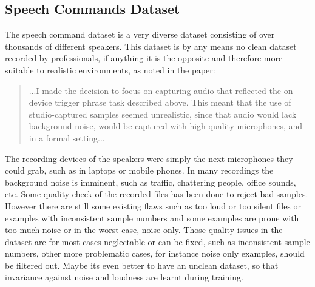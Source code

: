 
\subsection{Speech Commands Dataset}\label{sec:exp_dataset_speech_cmd}
The speech command dataset \cite{Warden2018} is a very diverse dataset consisting of over thousands of different speakers. 
This dataset is by any means no clean dataset recorded by professionals, if anything it is the opposite and therefore more suitable to realistic environments, as noted in the paper:
\begin{quote}
...I made the decision to focus on capturing audio that reflected the on-device trigger phrase task described above. 
This meant that the use of studio-captured samples seemed unrealistic, since that audio would lack background noise, would be captured with high-quality microphones, and in a formal setting...
\end{quote}
The recording devices of the speakers were simply the next microphones they could grab, such as in laptops or mobile phones.
In many recordings the background noise is imminent, such as traffic, chattering people, office sounds, etc.
Some quality check of the recorded files has been done to reject bad samples.
However there are still some existing flaws such as too loud or too silent files or examples with inconsistent sample numbers and some examples are prone with too much noise or in the worst case, noise only.
Those quality issues in the dataset are for most cases neglectable or can be fixed, such as inconsistent sample numbers, other more problematic cases, for instance noise only examples, should be filtered out.
Maybe its even better to have an unclean dataset, so that invariance against noise and loudness are learnt during training.

